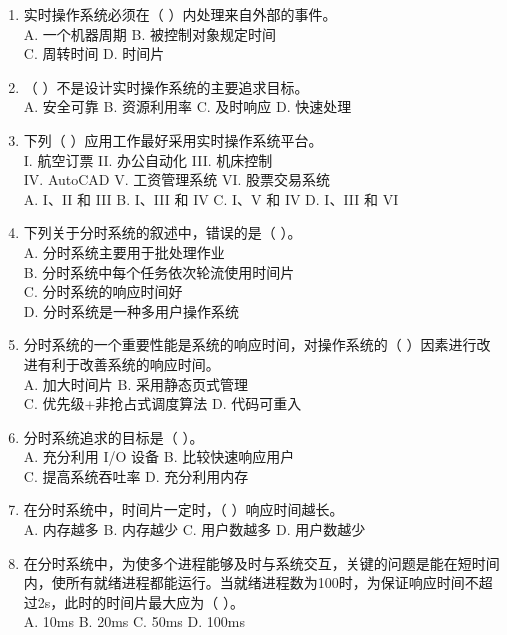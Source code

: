 \documentclass[lang=cn,newtx,10pt,scheme=chinese]{../../elegantbook}
\begin{document}
\begin{enumerate}
  \item 实时操作系统必须在（ ）内处理来自外部的事件。\\
  A. 一个机器周期 \quad B. 被控制对象规定时间\\
  C. 周转时间 \quad D. 时间片

  \item （ ）不是设计实时操作系统的主要追求目标。\\
  A. 安全可靠 \quad B. 资源利用率 \quad C. 及时响应 \quad D. 快速处理

  \item 下列（ ）应用工作最好采用实时操作系统平台。\\
  I. 航空订票 \quad II. 办公自动化 \quad III. 机床控制\\
  IV. AutoCAD \quad V. 工资管理系统 \quad VI. 股票交易系统\\
  A. I、II 和 III \quad B. I、III 和 IV \quad C. I、V 和 IV \quad D. I、III 和 VI

  \item 下列关于分时系统的叙述中，错误的是（ ）。\\
  A. 分时系统主要用于批处理作业\\
  B. 分时系统中每个任务依次轮流使用时间片\\
  C. 分时系统的响应时间好\\
  D. 分时系统是一种多用户操作系统
  \item 分时系统的一个重要性能是系统的响应时间，对操作系统的（ ）因素进行改进有利于改善系统的响应时间。\\
  A. 加大时间片 \quad B. 采用静态页式管理\\
  C. 优先级+非抢占式调度算法 \quad D. 代码可重入

  \item 分时系统追求的目标是（ ）。\\
  A. 充分利用 I/O 设备 \quad B. 比较快速响应用户\\
  C. 提高系统吞吐率 \quad D. 充分利用内存

  \item 在分时系统中，时间片一定时，（ ）响应时间越长。\\
  A. 内存越多 \quad B. 内存越少 \quad C. 用户数越多 \quad D. 用户数越少

  \item 在分时系统中，为使多个进程能够及时与系统交互，关键的问题是能在短时间内，使所有就绪进程都能运行。当就绪进程数为100时，为保证响应时间不超过2s，此时的时间片最大应为（ ）。\\
  A. 10ms \quad B. 20ms \quad C. 50ms \quad D. 100ms


\end{enumerate}
\end{document}
